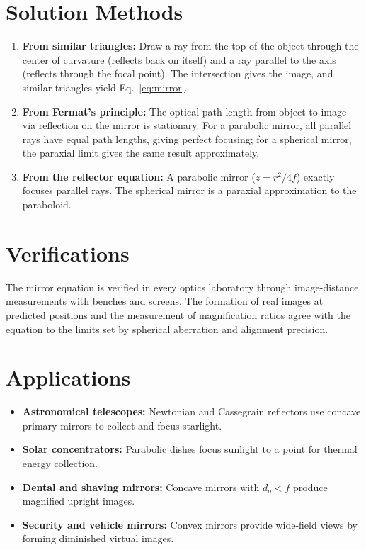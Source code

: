\documentclass[11pt,openright]{book}
\begin{document}
\section*{Solution Methods}

\begin{enumerate}
  \item \textbf{From similar triangles:} Draw a ray from the top of the object through the center of curvature (reflects back on itself) and a ray parallel to the axis (reflects through the focal point). The intersection gives the image, and similar triangles yield Eq.~\eqref{eq:mirror}.
  \item \textbf{From Fermat's principle:} The optical path length from object to image via reflection on the mirror is stationary. For a parabolic mirror, all parallel rays have equal path lengths, giving perfect focusing; for a spherical mirror, the paraxial limit gives the same result approximately.
  \item \textbf{From the reflector equation:} A parabolic mirror ($z = r^{2}/4f$) exactly focuses parallel rays. The spherical mirror is a paraxial approximation to the paraboloid.
\end{enumerate}
\section*{Verifications}

The mirror equation is verified in every optics laboratory through image-distance measurements with benches and screens. The formation of real images at predicted positions and the measurement of magnification ratios agree with the equation to the limits set by spherical aberration and alignment precision.
\section*{Applications}

\begin{itemize}
  \item \textbf{Astronomical telescopes:} Newtonian and Cassegrain reflectors use concave primary mirrors to collect and focus starlight.
  \item \textbf{Solar concentrators:} Parabolic dishes focus sunlight to a point for thermal energy collection.
  \item \textbf{Dental and shaving mirrors:} Concave mirrors with $d_{o} < f$ produce magnified upright images.
  \item \textbf{Security and vehicle mirrors:} Convex mirrors provide wide-field views by forming diminished virtual images.
\end{itemize}
\end{document}
